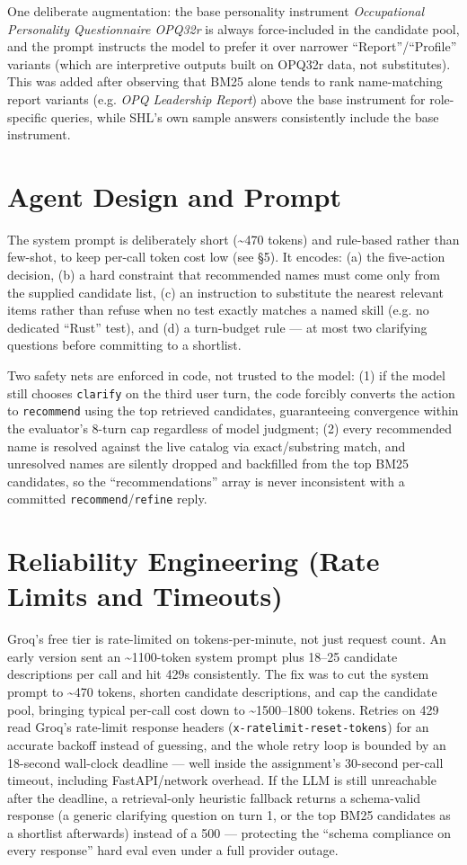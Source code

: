 \documentclass[10pt]{article}
\begin{document}
One deliberate augmentation: the base personality instrument \textit{Occupational Personality Questionnaire OPQ32r} is always force-included in the candidate pool, and the prompt instructs the model to prefer it over narrower ``Report''/``Profile'' variants (which are interpretive outputs built on OPQ32r data, not substitutes). This was added after observing that BM25 alone tends to rank name-matching report variants (e.g. \textit{OPQ Leadership Report}) above the base instrument for role-specific queries, while SHL's own sample answers consistently include the base instrument.

\section{Agent Design and Prompt}
The system prompt is deliberately short (\textasciitilde470 tokens) and rule-based rather than few-shot, to keep per-call token cost low (see \S5). It encodes: (a) the five-action decision, (b) a hard constraint that recommended names must come only from the supplied candidate list, (c) an instruction to substitute the nearest relevant items rather than refuse when no test exactly matches a named skill (e.g. no dedicated ``Rust'' test), and (d) a turn-budget rule --- at most two clarifying questions before committing to a shortlist.

Two safety nets are enforced in code, not trusted to the model: (1) if the model still chooses \texttt{clarify} on the third user turn, the code forcibly converts the action to \texttt{recommend} using the top retrieved candidates, guaranteeing convergence within the evaluator's 8-turn cap regardless of model judgment; (2) every recommended name is resolved against the live catalog via exact/substring match, and unresolved names are silently dropped and backfilled from the top BM25 candidates, so the ``recommendations'' array is never inconsistent with a committed \texttt{recommend}/\texttt{refine} reply.

\section{Reliability Engineering (Rate Limits and Timeouts)}
Groq's free tier is rate-limited on tokens-per-minute, not just request count. An early version sent an \textasciitilde1100-token system prompt plus 18--25 candidate descriptions per call and hit 429s consistently. The fix was to cut the system prompt to \textasciitilde470 tokens, shorten candidate descriptions, and cap the candidate pool, bringing typical per-call cost down to \textasciitilde1500--1800 tokens. Retries on 429 read Groq's rate-limit response headers (\texttt{x-ratelimit-reset-tokens}) for an accurate backoff instead of guessing, and the whole retry loop is bounded by an 18-second wall-clock deadline --- well inside the assignment's 30-second per-call timeout, including FastAPI/network overhead. If the LLM is still unreachable after the deadline, a retrieval-only heuristic fallback returns a schema-valid response (a generic clarifying question on turn 1, or the top BM25 candidates as a shortlist afterwards) instead of a 500 --- protecting the ``schema compliance on every response'' hard eval even under a full provider outage.
\end{document}
